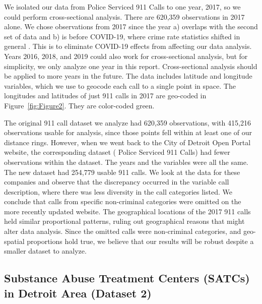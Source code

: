 \documentclass[12pt]{article}
\begin{document}
We isolated our data from Police Serviced 911 Calls to one year, 2017, so we could perform cross-sectional analysis. There are 620,359 observations in 2017 alone. We chose observations from 2017 since the year a) overlaps with the second set of data and b) is before COVID-19, where crime rate statistics shifted in general \citealp{covid_and_crime}. This is to eliminate COVID-19 effects from affecting our data analysis. Years 2016, 2018, and 2019 could also work for cross-sectional analysis, but for simplicity, we only analyze one year in this report. Cross-sectional analysis should be applied to more years in the future. The data includes latitude and longitude variables, which we use to geocode each call to a single point in space. The longitudes and latitudes of just 911 calls in 2017 are geo-coded in Figure~\ref{fig:Figure2}. They are color-coded green. 

The original 911 call dataset we analyze had 620,359 observations, with 415,216 observations usable for analysis, since those points fell within at least one of our distance rings. However, when we went back to the City of Detroit Open Portal website, the corresponding dataset ( Police Serviced 911 Calls) had fewer observations within the dataset. The years and the variables were all the same. The new dataset had 254,779 usable 911 calls. We look at the data for these companies and observe that the discrepancy occurred in the variable call description, where there was less diversity in the call categories listed. We conclude that calls from specific non-criminal categories were omitted on the more recently updated website. The geographical locations of the 2017 911 calls held similar proportional patterns, ruling out geographical reasons that might alter data analysis. Since the omitted calls were non-criminal categories, and geo-spatial proportions hold true, we believe that our results will be robust despite a smaller dataset to analyze.\footnotemark[1]

\subsection{Substance Abuse Treatment Centers (SATCs) in Detroit Area (Dataset 2)}
\end{document}
